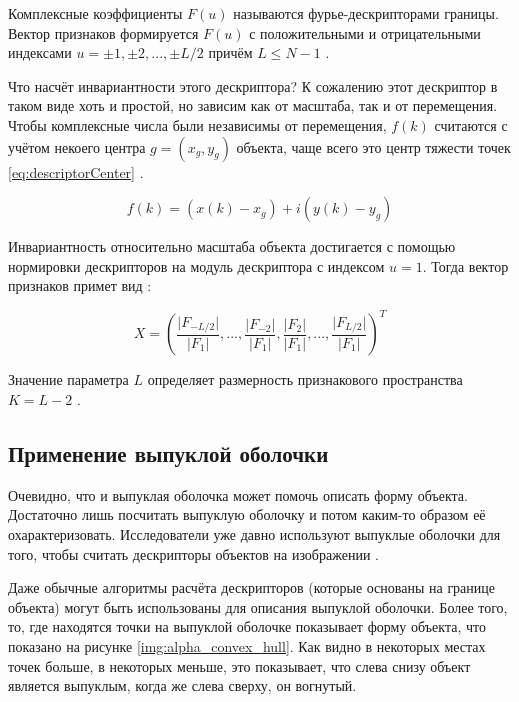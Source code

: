 Комплексные коэффициенты $F(u)$ называются фурье-дескрипторами границы. Вектор признаков формируется $F(u)$ с положительными и отрицательными индексами $u = \pm 1 ,\pm 2, ..., \pm L/2$ причём $L \leq N-1$ \cite{kolyuchkin2013visionAlgorithms}.

Что насчёт инвариантности этого дескриптора? К сожалению этот дескриптор в таком виде хоть и простой, но зависим как от масштаба, так и от перемещения. Чтобы комплексные числа были независимы от перемещения, $f(k)$ считаются с учётом некоего центра $g=(x_g,y_g)$ объекта, чаще всего это центр тяжести точек \eqref{eq:descriptorCenter} \cite{thang2010fourier}.

\begin{equation}\label{eq:descriptorCenter}
f(k)=(x(k)-x_g)+i(y(k)-y_g)
\end{equation}

Инвариантность относительно масштаба объекта достигается с помощью нормировки дескрипторов на модуль дескриптора с индексом $u=1$. Тогда вектор признаков примет вид \cite{kolyuchkin2013visionAlgorithms}:

\[
X=\left(\frac{\lvert{F_{-L/2}}\rvert}{\lvert{F_1}\rvert},...,\frac{\lvert{F_{-2}}\rvert}{\lvert{F_1}\rvert},\frac{\lvert{F_2}\rvert}{\lvert{F_1}\rvert},...,\frac{\lvert{F_{L/2}}\rvert}{\lvert{F_1}\rvert}\right)^T
\]

Значение параметра $L$ определяет размерность признакового пространства $K=L-2$ \cite{kolyuchkin2013visionAlgorithms}.

\subsection{Применение выпуклой оболочки}

Очевидно, что и выпуклая оболочка может помочь описать форму объекта. Достаточно лишь посчитать выпуклую оболочку и потом каким-то образом её охарактеризовать. Исследователи уже давно используют выпуклые оболочки для того, чтобы считать дескрипторы объектов на изображении \cite{dalitz2013fourier, mathew2015content}.

Даже обычные алгоритмы расчёта дескрипторов (которые основаны на границе объекта) могут быть использованы для описания выпуклой оболочки. Более того, то, где находятся точки на выпуклой оболочке показывает форму объекта, что показано на рисунке \ref{img:alpha_convex_hull}. Как видно в некоторых местах точек больше, в некоторых меньше, это показывает, что слева снизу объект является выпуклым, когда же слева сверху, он вогнутый.

